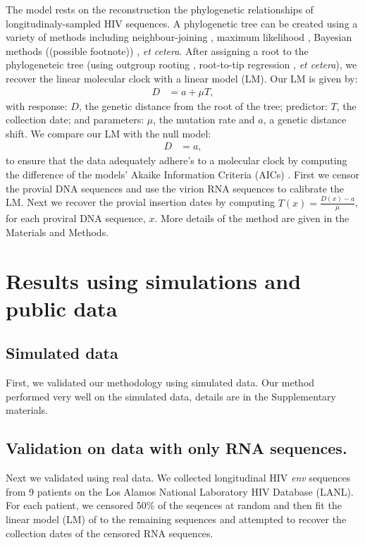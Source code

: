 \documentclass[10pt,twocolumn,twoside]{pnas-new}
\begin{document}
The model rests on the reconstruction the phylogenetic relationships of longitudinaly-sampled HIV sequences.
A phylogenetic tree can be created using a variety of methods including neighbour-joining \cite{Saitou87}, maximum likelihood \cite{fasttree,raxml}, Bayesian methods ((possible footnote)) \cite{beast}, \emph{et cetera}.
After assigning a root to the phylogeneteic tree (using outgroup rooting  \cite{Huelsenbeck02}, root-to-tip regression  \cite{Korber00}, \emph{et cetera}), we recover the linear molecular clock with a linear model (LM).
Our LM is given by:
\begin{align}
	D &= a + \mu T,\label{eq:glm}
\end{align}
with response: $D$, the genetic distance from the root of the tree; predictor: $T$, the collection date; and parameters: $\mu$, the mutation rate and $a$, a genetic distance shift.
We compare our LM with the null model:
\begin{align}
	D &= a,\label{eq:null}
\end{align}
to ensure that the data adequately adhere's to a molecular clock by computing the difference of the models' Akaike Information Criteria (AICs) \cite{Akaike74}.
First we censor the provial DNA sequences and use the virion RNA sequences to calibrate the LM.
Next we recover the provial insertion dates by computing $T(x) = \frac{D(x) - a}{\mu}$, for each proviral DNA sequence, $x$.
More details of the method are given in the Materials and Methods.

\section{Results using simulations and public data}

\subsection{Simulated data}

First, we validated our methodology using simulated data.
Our method performed very well on the simulated data, details are in the Supplementary materials.

\subsection{Validation on data with only RNA sequences.}

Next we validated using real data.
We collected longitudinal HIV \emph{env} sequences from 9 patients on the Los Alamos National Laboratory HIV Database (LANL).
For each patient, we censored 50\% of the seqences at random and then fit the linear model (LM) of \label{eq:glm} to the remaining sequences and attempted to recover the collection dates of the censored RNA sequences.
\end{document}

